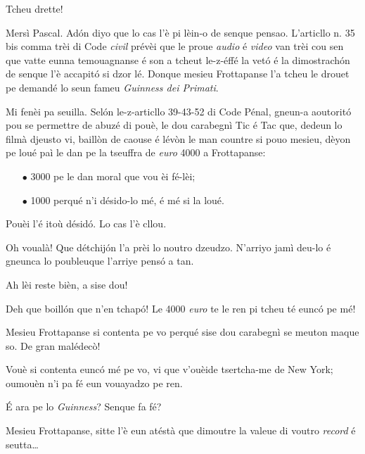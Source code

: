 \begin{drama}
\Pascalspeaks Tcheu drette!


\DzeudzoSenliquerspeaks Mersì Pascal. Adón diyo que lo cas l'è pi lèin-o de senque pensao. L'articllo n. 35 bis comma trèi di Code \textit{civil} prévèi que le proue \textit{audio} é \textit{video} van trèi cou sen que vatte eunna temouagnanse é son a tcheut le-z-éffé la vetó é la dimostrachón de senque l’è accapitó si dzor lé. Donque mesieu Frottapanse l'a tcheu le drouet pe demandé lo seun fameu \textit{Guinness dei Primati}.


\DzeudzoSenliquerspeaks Mi fenèi pa seuilla. Selón le-z-articllo 39-43-52 di Code Pénal, gneun-a aoutoritó pou se permettre de abuzé di pouè, le dou carabegnì Tic é Tac que, dedeun lo filmà djeusto vi, baillòn de caouse é lévòn le man countre si pouo mesieu, dèyon pe loué paì le dan pe la tseuffra de \textit{euro} 4000 a Frottapanse: 
\begin{itemize}
\item[$\bullet$] 3000 pe le dan moral que vou èi fé-lèi;
\item[$\bullet$] 1000 perqué n’i désido-lo mé, é mé si la loué.
\end{itemize}
Pouèi l'é itoù désidó. Lo cas l'è cllou. 


\Ritaspeaks Oh voualà! Que détchijón l’a prèi lo noutro dzeudzo. N'arriyo jamì deu-lo é gneunca lo poubleuque l'arriye pensó a tan.

\Cienspeaks Ah lèi reste bièn, a sise dou!

\Ticspeaks{} Deh que boillón que n'en tchapó! Le 4000 \textit{euro} te le ren pi tcheu té eunc\'o pe mé!

\Ritaspeaks Mesieu Frottapanse si contenta pe vo perqué sise dou carabegnì se meuton maque so. De gran malédec\`o!

\Tissotspeaks Vouè si contenta eunc\'o mé pe vo, vi que v'ouèide tsertcha-me de New York; oumouèn n’i pa fé eun vouayadzo pe ren.

\Cienspeaks É ara pe lo \textit{Guinness}? Senque fa fé?

\Tissotspeaks Mesieu Frottapanse, sitte l’è eun atéstà que dimoutre la valeue di voutro \textit{record} é seutta\ldots


\end{drama}
